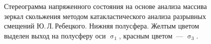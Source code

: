 \begin{figure}[H]
\begin{changemargin}{0cm}{0cm}
\begin{center}
\begin{minipage}[h]{0.33\linewidth}
        \caption{Стереограмма напряженного состояния на основе
    анализа массива зеркал скольжения методом катакластического анализа разрывных смещений Ю.\,Л.\,Ребецкого.
    Нижняя полусфера. Желтым цветом выделен выход на полусферу оси $\upsigma_1$, красным цветом~--- $\upsigma_3$.}
        \label{fig:kondratev-fig3}
    \end{minipage}


  \end{center}
\end{changemargin}

\end{figure}
